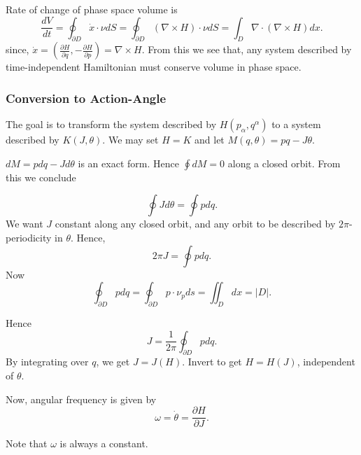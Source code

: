 Rate of change of phase space volume is
\[
	\frac{dV}{dt} = \oint_{\partial D} \dot{x} \cdot \nu d S
	= \oint_{\partial D} (\nabla \times H) \cdot \nu d S
	= \int_{D} \nabla \cdot  (\nabla \times H) dx
.\] 
since, $\dot{x} = (\frac{\partial H}{\partial q}, - \frac{\partial H}{\partial p} ) = \nabla \times H $. From this we see that, any system described by time-independent Hamiltonian must conserve volume in phase space.

\subsubsection{Conversion to Action-Angle}

The goal is to transform the system described by  $H(p_\alpha, q^\alpha)$ to a system described by $K(J, \theta)$. We may set $H = K$ and let $M(q, \theta) = p q - J \theta$. 

$dM = p d q - J d \theta$ is an exact form. Hence $\oint dM = 0$ along a closed orbit. From this we conclude

\[
	\oint J d \theta = \oint p d q
.\] 
We want $J$ constant along any closed orbit, and any orbit to be described by $2 \pi$-periodicity in $\theta$. Hence, 
\[
	2 \pi J = \oint p d q
.\] 
Now
\[
	\oint_{\partial D} p d q
	=\oint_{\partial D} p \cdot \nu_p d s
	=\iint_D dx = |D|
.\] 

Hence
\[
	J = \frac{1}{2 \pi} \oint_{\partial D} p d q
.\] 
By integrating over $q$, we get $J = J(H)$. Invert to get $H = H(J)$, independent of $\theta$.

Now, angular frequency is given by
\[
	\omega = \dot{\theta} = \frac{\partial H}{\partial J} 
.\] 

Note that $\omega$ is always a constant.

